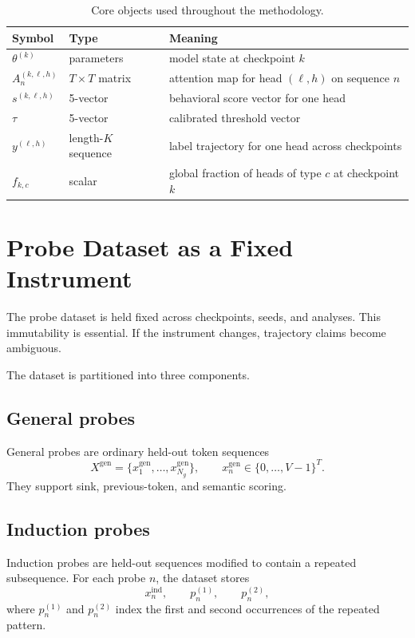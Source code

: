 \documentclass[11pt]{article}
\newcommand{\1}{\mathbf{1}}
\begin{document}
\begin{table}[h]
\centering
\renewcommand{\arraystretch}{1.18}
\begin{tabularx}{\textwidth}{@{}p{}p{}Y@{}}
\toprule
\textbf{Symbol} & \textbf{Type} & \textbf{Meaning} \\
\midrule
$\theta^{(k)}$ & parameters & model state at checkpoint $k$ \\
$A_n^{(k,\ell,h)}$ & $T \times T$ matrix & attention map for head $(\ell,h)$ on sequence $n$ \\
$s^{(k,\ell,h)}$ & 5-vector & behavioral score vector for one head \\
$\tau$ & 5-vector & calibrated threshold vector \\
$y^{(\ell,h)}$ & length-$K$ sequence & label trajectory for one head across checkpoints \\
$f_{k,c}$ & scalar & global fraction of heads of type $c$ at checkpoint $k$ \\
\bottomrule
\end{tabularx}
\caption{Core objects used throughout the methodology.}
\end{table}

\section{Probe Dataset as a Fixed Instrument}

The probe dataset is held fixed across checkpoints, seeds, and analyses. This
immutability is essential. If the instrument changes, trajectory claims become
ambiguous.

The dataset is partitioned into three components.

\subsection{General probes}

General probes are ordinary held-out token sequences
\[
X^{\mathrm{gen}} = \{x^{\mathrm{gen}}_1,\dots,x^{\mathrm{gen}}_{N_g}\},
\qquad
x^{\mathrm{gen}}_n \in \{0,\dots,V-1\}^T.
\]
They support sink, previous-token, and semantic scoring.

\subsection{Induction probes}

Induction probes are held-out sequences modified to contain a repeated
subsequence. For each probe $n$, the dataset stores
\[
x_n^{\mathrm{ind}}, \qquad p_n^{(1)}, \qquad p_n^{(2)},
\]
where $p_n^{(1)}$ and $p_n^{(2)}$ index the first and second occurrences of the
repeated pattern.
\end{document}
